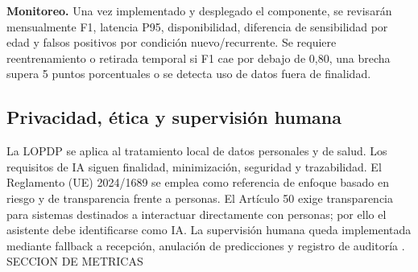 \documentclass[11pt,a4paper]{article}
\begin{document}
\textbf{Monitoreo.} Una vez implementado y desplegado el componente, se revisarán mensualmente F1, latencia P95, disponibilidad, diferencia de sensibilidad por edad y falsos positivos por condición nuevo/recurrente. Se requiere reentrenamiento o retirada temporal si F1 cae por debajo de 0,80, una brecha supera 5 puntos porcentuales o se detecta uso de datos fuera de finalidad.

\subsection{Privacidad, ética y supervisión humana}
La LOPDP se aplica al tratamiento local de datos personales y de salud. Los requisitos de IA siguen finalidad, minimización, seguridad y trazabilidad. El Reglamento (UE) 2024/1689 se emplea como referencia de enfoque basado en riesgo y de transparencia frente a personas. El Artículo 50 exige transparencia para sistemas destinados a interactuar directamente con personas; por ello el asistente debe identificarse como IA. La supervisión humana queda implementada mediante fallback a recepción, anulación de predicciones y registro de auditoría \cite{loppd,euaiact2024,whoai2021}.
\clearpage
	SECCION DE METRICAS 
	
\end{document}
